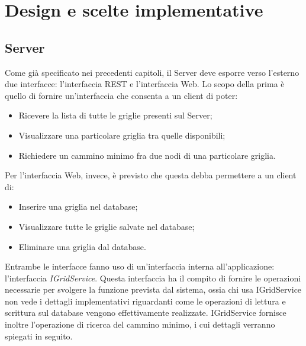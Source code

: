 \chapter{Design e scelte implementative}

\section{Server}

Come gi\`a specificato nei precedenti capitoli, il Server deve esporre verso l'esterno due interfacce: l'interfaccia REST e l'interfaccia Web. Lo scopo della prima \`e quello di fornire un'interfaccia che consenta a un client di poter:
\begin{itemize}
	\item Ricevere la lista di tutte le griglie presenti sul Server;
	\item Visualizzare una particolare griglia tra quelle disponibili;
	\item Richiedere un cammino minimo fra due nodi di una particolare griglia.
\end{itemize}
Per l'interfaccia Web, invece, \`e previsto che questa debba permettere a un client di:
\begin{itemize}
	\item Inserire una griglia nel database;
	\item Visualizzare tutte le griglie salvate nel database;
	\item Eliminare una griglia dal database.
\end{itemize}
Entrambe le interfacce fanno uso di un'interfaccia interna all'applicazione: l'interfaccia \emph{IGridService}. Questa interfaccia ha il compito di fornire le operazioni necessarie per svolgere la funzione prevista dal sistema, ossia chi usa IGridService non vede i dettagli implementativi riguardanti come le operazioni di lettura e scrittura sul database vengono effettivamente realizzate. IGridService fornisce inoltre l'operazione di ricerca del cammino minimo, i cui dettagli verranno spiegati in seguito.
